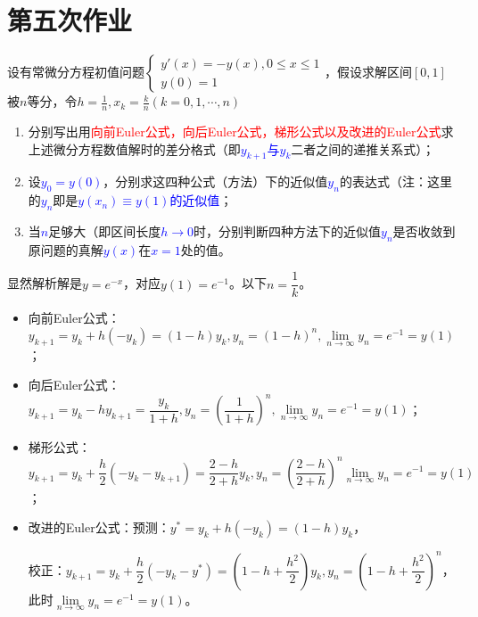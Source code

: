 \chapter{第五次作业}

    \begin{homework}[12pts]
        设有常微分方程初值问题$\begin{cases}y'(x)=-y(x),0\leq x\leq 1\\y(0)=1\end{cases}$，假设求解区间$[0,1]$被$n$等分，令$h=\frac1n,x_k=\frac kn(k=0,1,\cdots,n)$
        \begin{enumerate}
            \item 分别写出用\textcolor{red}{向前Euler公式，向后Euler公式，梯形公式以及改进的Euler公式}求上述微分方程数值解时的差分格式（即\textcolor{blue}{$y_{k+1}$与$y_k$}二者之间的递推关系式）；
            \item 设\textcolor{blue}{$y_0=y(0)$}，分别求这四种公式（方法）下的近似值\textcolor{blue}{$y_n$}的表达式（注：这里的\textcolor{blue}{$y_n$}即是\textcolor{blue}{$y(x_n)\equiv y(1)$的近似值}；
            \item 当\textcolor{blue}{$n$}足够大（即区间长度\textcolor{blue}{$h\rightarrow 0$}时，分别判断四种方法下的近似值\textcolor{blue}{$y_n$}是否收敛到原问题的真解\textcolor{blue}{$y(x)$}在\textcolor{blue}{$x=1$}处的值。
        \end{enumerate}
    \end{homework}

    \begin{solution}
        显然解析解是$y=e^{-x}$，对应$y(1)=e^{-1}$。以下$n=\dfrac1k$。
        \begin{itemize}
            \item 向前Euler公式：$y_{k+1}=y_k+h(-y_k)=(1-h)y_k,y_n=(1-h)^n,\lim\limits_{n\rightarrow \infty}y_n=e^{-1}=y(1)$；
            \item 向后Euler公式：$y_{k+1}=y_k-hy_{k+1}=\dfrac{y_k}{1+h},y_n=\left(\dfrac1{1+h}\right)^n,\lim\limits_{n\rightarrow \infty}y_n=e^{-1}=y(1)$；
            \item 梯形公式：$y_{k+1}=y_k+\dfrac h2(-y_k-y_{k+1})=\dfrac{2-h}{2+h}y_k,y_n=\left(\dfrac{2-h}{2+h}\right)^n\lim\limits_{n\rightarrow \infty}y_n=e^{-1}=y(1)$；
            \item 改进的Euler公式：预测：$y^*=y_k+h(-y_k)=(1-h)y_k$，

                校正：$y_{k+1}=y_k+\dfrac h2(-y_k-y^*)=\left(1-h+\dfrac {h^2} 2\right)y_k,y_n=\left(1-h+\dfrac {h^2} 2\right)^n$，此时$\lim\limits_{n\rightarrow \infty}y_n=e^{-1}=y(1)$。
        \end{itemize}


    \end{solution}

